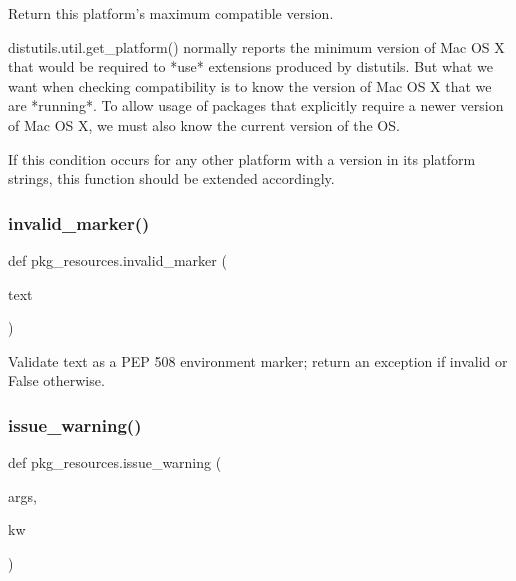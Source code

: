 \begin{DoxyVerb}Return this platform's maximum compatible version.

distutils.util.get_platform() normally reports the minimum version
of Mac OS X that would be required to *use* extensions produced by
distutils.  But what we want when checking compatibility is to know the
version of Mac OS X that we are *running*.  To allow usage of packages that
explicitly require a newer version of Mac OS X, we must also know the
current version of the OS.

If this condition occurs for any other platform with a version in its
platform strings, this function should be extended accordingly.
\end{DoxyVerb}
 \mbox{\label{namespacepkg__resources_aeb46162da9479c499b4bac06b6ed557a}} 
\subsubsection{\texorpdfstring{invalid\+\_\+marker()}{invalid\_marker()}}
{\footnotesize\ttfamily def pkg\+\_\+resources.\+invalid\+\_\+marker (\begin{DoxyParamCaption}\item[{}]{text }\end{DoxyParamCaption})}

\begin{DoxyVerb}Validate text as a PEP 508 environment marker; return an exception
if invalid or False otherwise.
\end{DoxyVerb}
 \mbox{\label{namespacepkg__resources_a0d5beebf84841e70b7b06058e4fb4cc2}} 
\subsubsection{\texorpdfstring{issue\+\_\+warning()}{issue\_warning()}}
{\footnotesize\ttfamily def pkg\+\_\+resources.\+issue\+\_\+warning (\begin{DoxyParamCaption}\item[{}]{args,  }\item[{}]{kw }\end{DoxyParamCaption})}

